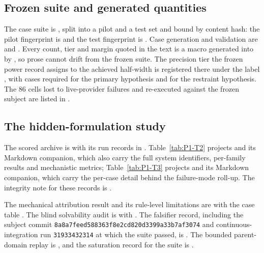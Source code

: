 \subsection{Frozen suite and generated quantities}
The case suite is , split into a pilot and a test set and
bound by content hash: the pilot fingerprint is
\texttt{\PilotSuiteFingerprintShort} and the test fingerprint is
\texttt{\TestSuiteFingerprintShort}. Case generation and validation are
 and
. Every count, tier and margin quoted in
the text is a macro generated into 
by , so prose cannot drift from the frozen
suite. The precision tier the frozen power record assigns to the achieved
half-width is registered there under the label \texttt{\AchievedTier}, with
\RequiredNForHOne{} cases required for the primary hypothesis and
\RequiredNForHTwo{} for the restraint hypothesis. The 86 cells lost to live-provider failures and re-executed against the
frozen subject are listed in .

\subsection{The hidden-formulation study}
The scored archive is  with its run records
in . Table~\ref{tab:P1-T2} projects
 and its Markdown companion,
which also carry the full system identifiers, per-family results and mechanistic
metrics; Table~\ref{tab:P1-T3} projects
 and its Markdown companion, which
carry the per-case detail behind the failure-mode roll-up. The integrity note
for these records is .

The mechanical attribution result and its rule-level limitations are
 with the case table
. The blind solvability audit is
 with
. The falsifier record,
including the subject commit \texttt{8a8a7feed588363f8e2cd820d3399a33b7af3074}
and continuous-integration run \texttt{31933432314} at which the suite passed,
is . The bounded parent-domain replay is
, and the saturation record for the
suite is .

